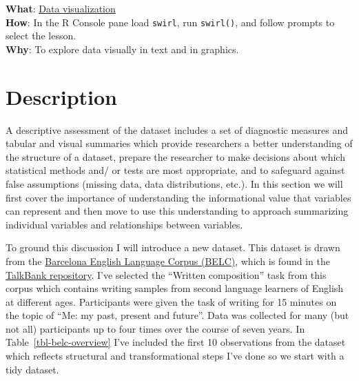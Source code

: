 \documentclass[
  letterpaper,
]{latex/krantz}
\begin{document}
\begin{tcolorbox}[enhanced jigsaw, opacitybacktitle=0.6, breakable, colframe=quarto-callout-tip-color-frame, arc=.35mm, left=2mm, leftrule=.75mm, title=\textcolor{quarto-callout-tip-color}{\faLightbulb}\hspace{0.5em}{Interactive programming}, opacityback=0, colback=white, toptitle=1mm, rightrule=.15mm, titlerule=0mm, bottomtitle=1mm, bottomrule=.15mm, coltitle=black, colbacktitle=quarto-callout-tip-color!10!white, toprule=.15mm]
\textbf{What}: \href{https://github.com/lin380/swirl}{Data
visualization}\\
\textbf{How}: In the R Console pane load \texttt{swirl}, run
\texttt{swirl()}, and follow prompts to select the lesson.\\
\textbf{Why}: To explore data visually in text and in graphics.
\end{tcolorbox}

\hypertarget{description}{%
\section{Description}\label{description}}

A descriptive assessment of the dataset includes a set of diagnostic
measures and tabular and visual summaries which provide researchers a
better understanding of the structure of a dataset, prepare the
researcher to make decisions about which statistical methods and/ or
tests are most appropriate, and to safeguard against false assumptions
(missing data, data distributions, etc.). In this section we will first
cover the importance of understanding the informational value that
variables can represent and then move to use this understanding to
approach summarizing individual variables and relationships between
variables.

To ground this discussion I will introduce a new dataset. This dataset
is drawn from the
\href{https://slabank.talkbank.org/access/English/BELC.html}{Barcelona
English Language Corpus (BELC)}, which is found in the
\href{http://talkbank.org/}{TalkBank repository}. I've selected the
``Written composition'' task from this corpus which contains writing
samples from second language learners of English at different ages.
Participants were given the task of writing for 15 minutes on the topic
of ``Me: my past, present and future''. Data was collected for many (but
not all) participants up to four times over the course of seven years.
In Table~\ref{tbl-belc-overview} I've included the first 10 observations
from the dataset which reflects structural and transformational steps
I've done so we start with a tidy dataset.
\end{document}

